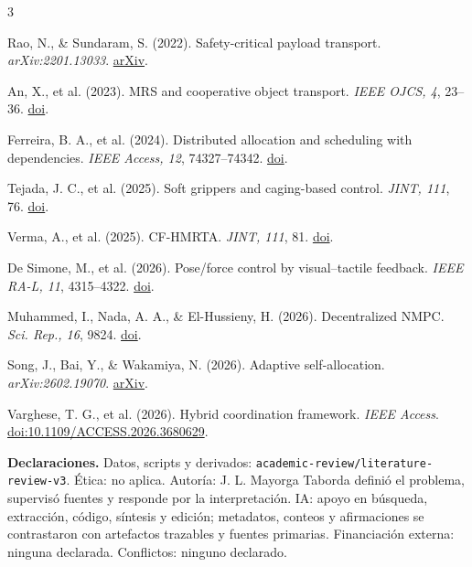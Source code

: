 \documentclass[10pt,letterpaper]{article}
\newcommand{\boxtext}[2]{\colorbox{#1}{\parbox{\dimexpr\linewidth-2\fboxsep\relax}{\fontsize{7.55}{8.2}\selectfont #2}}}
\begin{document}
\begin{multicols}{3}
\begin{enumerate}[label={[\arabic*]},leftmargin=3.5mm]
\item Rao, N., \& Sundaram, S. (2022). Safety-critical payload transport. \emph{arXiv:2201.13033}. \href{https://doi.org/10.48550/arXiv.2201.13033}{arXiv}.
\item An, X., et al. (2023). MRS and cooperative object transport. \emph{IEEE OJCS, 4}, 23--36. \href{https://doi.org/10.1109/OJCS.2023.3238324}{doi}.
\item Ferreira, B. A., et al. (2024). Distributed allocation and scheduling with dependencies. \emph{IEEE Access, 12}, 74327--74342. \href{https://doi.org/10.1109/ACCESS.2024.3404823}{doi}.
\item Tejada, J. C., et al. (2025). Soft grippers and caging-based control. \emph{JINT, 111}, 76. \href{https://doi.org/10.1007/s10846-025-02263-y}{doi}.
\item Verma, A., et al. (2025). CF-HMRTA. \emph{JINT, 111}, 81. \href{https://doi.org/10.1007/s10846-025-02287-4}{doi}.
\item De Simone, M., et al. (2026). Pose/force control by visual--tactile feedback. \emph{IEEE RA-L, 11}, 4315--4322. \href{https://doi.org/10.1109/LRA.2026.3665445}{doi}.
\item Muhammed, I., Nada, A. A., \& El-Hussieny, H. (2026). Decentralized NMPC. \emph{Sci. Rep., 16}, 9824. \href{https://doi.org/10.1038/s41598-026-41881-w}{doi}.
\item Song, J., Bai, Y., \& Wakamiya, N. (2026). Adaptive self-allocation. \emph{arXiv:2602.19070}. \href{https://arxiv.org/abs/2602.19070}{arXiv}.
\item Varghese, T. G., et al. (2026). Hybrid coordination framework. \emph{IEEE Access}. \href{https://doi.org/10.1109/ACCESS.2026.3680629}{doi:10.1109/ACCESS.2026.3680629}.
\end{enumerate}
\end{multicols}

\vspace{.2mm}
\boxtext{soft}{\fontsize{6.05}{6.55}\selectfont\textbf{Declaraciones.} Datos, scripts y derivados: \texttt{academic-review/literature-review-v3}. Ética: no aplica. Autoría: J. L. Mayorga Taborda definió el problema, supervisó fuentes y responde por la interpretación. IA: apoyo en búsqueda, extracción, código, síntesis y edición; metadatos, conteos y afirmaciones se contrastaron con artefactos trazables y fuentes primarias. Financiación externa: ninguna declarada. Conflictos: ninguno declarado.}
\end{document}
